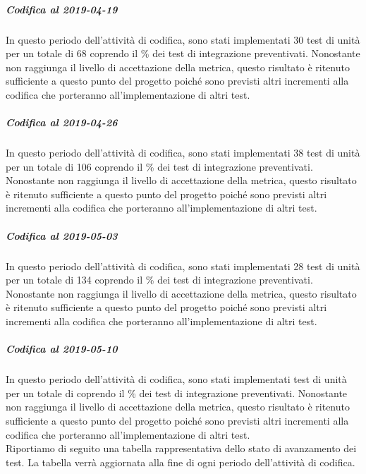 \subparagraph{Codifica al 2019-04-19}
In questo periodo dell'attività di codifica, sono stati implementati 30 test di unità per un totale di 68 coprendo il \% dei test di integrazione preventivati.
Nonostante non raggiunga il livello di accettazione della
metrica, questo risultato è ritenuto sufficiente a questo punto del progetto poiché sono previsti altri incrementi alla codifica che porteranno all'implementazione di altri test.

\subparagraph{Codifica al 2019-04-26}
In questo periodo dell'attività di codifica, sono stati implementati 38 test di unità per un totale di 106 coprendo il \% dei test di integrazione preventivati.
Nonostante non raggiunga il livello di accettazione della
metrica, questo risultato è ritenuto sufficiente a questo punto del progetto poiché sono previsti altri incrementi alla codifica che porteranno all'implementazione di altri test.

\subparagraph{Codifica al 2019-05-03}
In questo periodo dell'attività di codifica, sono stati implementati 28 test di unità per un totale di 134 coprendo il \% dei test di integrazione preventivati.
Nonostante non raggiunga il livello di accettazione della
metrica, questo risultato è ritenuto sufficiente a questo punto del progetto poiché sono previsti altri incrementi alla codifica che porteranno all'implementazione di altri test.

\subparagraph{Codifica al 2019-05-10}
In questo periodo dell'attività di codifica, sono stati implementati  test di unità per un totale di  coprendo il \% dei test di integrazione preventivati.
Nonostante non raggiunga il livello di accettazione della
metrica, questo risultato è ritenuto sufficiente a questo punto del progetto poiché sono previsti altri incrementi alla codifica che porteranno all'implementazione di altri test.
\\Riportiamo di seguito una tabella rappresentativa dello stato di avanzamento dei test. La tabella verrà aggiornata alla fine di ogni periodo dell'attività di codifica.

